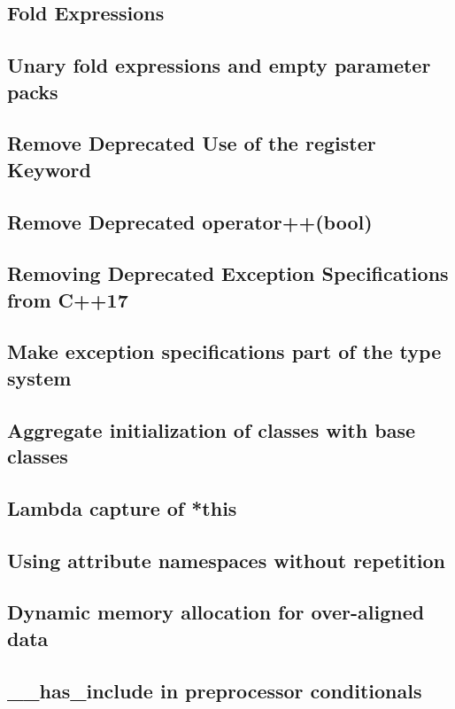 \documentclass{book}
\begin{document}
\subsection{Fold Expressions}

\subsection{Unary fold expressions and empty parameter packs}

\subsection{Remove Deprecated Use of the register Keyword}

\subsection{Remove Deprecated operator++(bool)}

\subsection{Removing Deprecated Exception Specifications from C++17}

\subsection{Make exception specifications part of the type system}

\subsection{Aggregate initialization of classes with base classes}

\subsection{Lambda capture of *this}

\subsection{Using attribute namespaces without repetition}

\subsection{Dynamic memory allocation for over-aligned data}


\subsection{\_\_has\_include in preprocessor conditionals}
\end{document}
